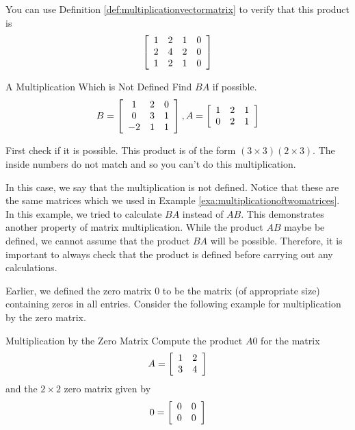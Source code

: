 \begin{solution}
You can use Definition \ref{def:multiplicationvectormatrix} to verify that this product is
\begin{equation*}
\left[
\begin{array}{cccc}
1 & 2 & 1 & 0 \\
2 & 4 & 2 & 0 \\
1 & 2 & 1 & 0
\end{array}
\right]
\end{equation*}
\end{solution}

\begin{example}{A Multiplication Which is Not Defined}\label{exa:undefinedmatrixmultiplication}
Find $BA$ if possible.
\begin{equation*}
B = \left[
\begin{array}{ccc}
1 & 2 & 0 \\
0 & 3 & 1 \\
-2 & 1 & 1
\end{array}
\right],  A = \left[
\begin{array}{ccc}
1 & 2 & 1 \\
0 & 2 & 1
\end{array}
\right]
\end{equation*}
\end{example}

\begin{solution} First check if it is possible. This product is of the form $\left( 3\times 3\right)
\left( 2\times 3\right) .$ The inside numbers do not match and so you can't
do this multiplication. 
\end{solution}

In this case, we say that the multiplication is not defined. 
Notice that these are the same matrices which we used in Example \ref{exa:multiplicationoftwomatrices}.
In this example, we tried to calculate $BA$ instead of $AB$. This demonstrates another property 
of matrix multiplication. While the product $AB$ maybe be defined, we cannot assume that
the product $BA$ will be possible. Therefore, it is important to always check that the product is defined
before carrying out any calculations.

Earlier, we defined the zero matrix $0$ to be the matrix (of
appropriate size) containing zeros in all entries.  Consider the
following example for multiplication by the zero matrix.

\begin{example}{Multiplication by the Zero Matrix}\label{exa:multbyzeromatrix}
Compute the product $A0$ for the matrix
\begin{equation*}
A=
\left[
\begin{array}{rr}
1 & 2 \\
3 & 4
\end{array}
\right]
\end{equation*}
and the $2 \times 2$ zero matrix given by
\begin{equation*}
0=
\left[
\begin{array}{rr}
0 & 0 \\
0 & 0
\end{array}
\right]
\end{equation*}
\end{example}

